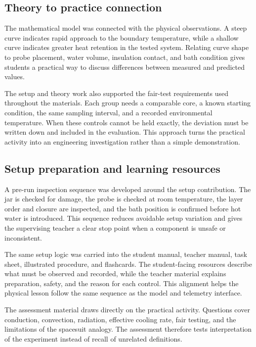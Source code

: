 \documentclass[10pt,conference,a4paper]{IEEEtran}
\begin{document}
\subsection*{Theory to practice connection}

The mathematical model was connected with the physical observations. A steep curve indicates rapid approach to the boundary temperature, while a shallow curve indicates greater heat retention in the tested system. Relating curve shape to probe placement, water volume, insulation contact, and bath condition gives students a practical way to discuss differences between measured and predicted values.

The setup and theory work also supported the fair-test requirements used throughout the materials. Each group needs a comparable core, a known starting condition, the same sampling interval, and a recorded environmental temperature. When these controls cannot be held exactly, the deviation must be written down and included in the evaluation. This approach turns the practical activity into an engineering investigation rather than a simple demonstration.

\subsection*{Setup preparation and learning resources}

A pre-run inspection sequence was developed around the setup contribution. The jar is checked for damage, the probe is checked at room temperature, the layer order and closure are inspected, and the bath position is confirmed before hot water is introduced. This sequence reduces avoidable setup variation and gives the supervising teacher a clear stop point when a component is unsafe or inconsistent.

The same setup logic was carried into the student manual, teacher manual, task sheet, illustrated procedure, and flashcards. The student-facing resources describe what must be observed and recorded, while the teacher material explains preparation, safety, and the reason for each control. This alignment helps the physical lesson follow the same sequence as the model and telemetry interface.

The assessment material draws directly on the practical activity. Questions cover conduction, convection, radiation, effective cooling rate, fair testing, and the limitations of the spacesuit analogy. The assessment therefore tests interpretation of the experiment instead of recall of unrelated definitions.

\endgroup
\end{document}
